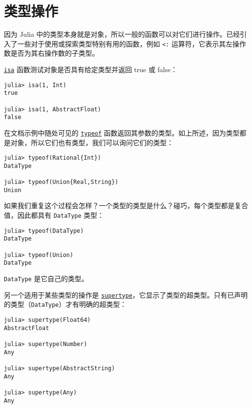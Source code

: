 \hypertarget{17381545984694686313}{}


\section{类型操作}



因为 Julia 中的类型本身就是对象，所以一般的函数可以对它们进行操作。已经引入了一些对于使用或探索类型特别有用的函数，例如 \texttt{<:} 运算符，它表示其左操作数是否为其右操作数的子类型。



\hyperlink{7066325108767373297}{\texttt{isa}} 函数测试对象是否具有给定类型并返回 true 或 false：




\begin{verbatim}
julia> isa(1, Int)
true

julia> isa(1, AbstractFloat)
false
\end{verbatim}



在文档示例中随处可见的 \hyperlink{13440452181855594120}{\texttt{typeof}} 函数返回其参数的类型。如上所述，因为类型都是对象，所以它们也有类型，我们可以询问它们的类型：




\begin{verbatim}
julia> typeof(Rational{Int})
DataType

julia> typeof(Union{Real,String})
Union
\end{verbatim}



如果我们重复这个过程会怎样？一个类型的类型是什么？碰巧，每个类型都是复合值，因此都具有 \texttt{DataType} 类型：




\begin{verbatim}
julia> typeof(DataType)
DataType

julia> typeof(Union)
DataType
\end{verbatim}



\texttt{DataType} 是它自己的类型。



另一个适用于某些类型的操作是 \hyperlink{12192788431675298651}{\texttt{supertype}}，它显示了类型的超类型。只有已声明的类型（\texttt{DataType}）才有明确的超类型：




\begin{verbatim}
julia> supertype(Float64)
AbstractFloat

julia> supertype(Number)
Any

julia> supertype(AbstractString)
Any

julia> supertype(Any)
Any
\end{verbatim}



